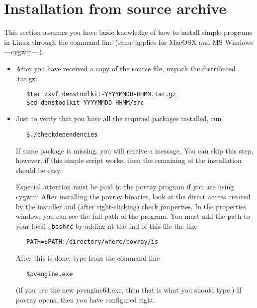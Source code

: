 \section{Installation from source archive}

This section assumes you have basic knowledge of how to install simple programs in Linux through the command line (same applies for MacOSX and MS Windows ---cygwin---).

\begin{itemize}
\item After you have received a copy of the source file, unpack the distributed .tar.gz:
\begin{verbatim}
   $tar zxvf denstoolkit-YYYYMMDD-HHMM.tar.gz
   $cd denstoolkit-YYYYMMDD-HHMM/src
\end{verbatim}
\item Just to verify that you have all the required packages installed, run
\begin{verbatim}
   $./checkdependencies
\end{verbatim}
 If some package is missing, you will receive a message. You can skip this step, however, if this simple script works, then the remaining of the installation should be easy.
 
 Especial attention must be paid to the povray program if you are using cygwin: After installing the povray binaries, look at the direct access created by the installer and (after right-clicking) check properties. In the properties window, you can see the full path of the program. You must add the path to your local \texttt{.bashrc} by adding at the end of this file the line
\begin{verbatim}
   PATH=$PATH:/directory/where/povray/is
\end{verbatim}
After this is done, type from the command line
\begin{verbatim}
   $pvengine.exe
\end{verbatim}
(if you use the new pvengine64.exe, then that is what you should type.) If povray opens, then you have configured right.


\end{itemize}
